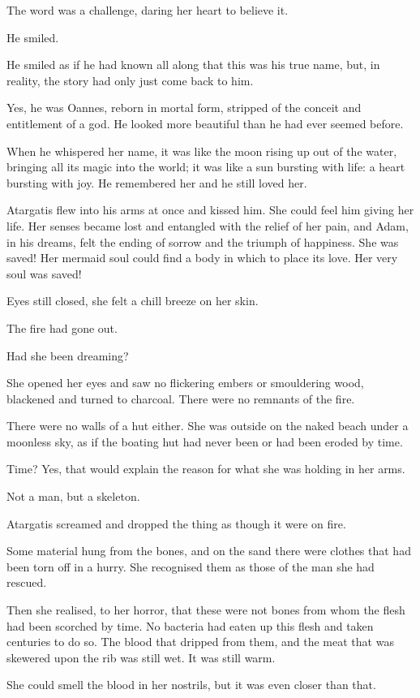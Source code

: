 The word was a challenge, daring her heart to believe it.

He smiled.

He smiled as if he had known all along that this was his true name,
but, in reality, the story had only just come back to him.

Yes, he was Oannes, reborn in mortal form, stripped of the conceit and
entitlement of a god.  He looked more beautiful than he had ever
seemed before.

When he whispered her name, it was like the moon rising up out of the
water, bringing all its magic into the world; it was like a sun
bursting with life: a heart bursting with joy. He remembered her and
he still loved her.

Atargatis flew into his arms at once and kissed him. She could feel
him giving her life. Her senses became lost and entangled with the
relief of her pain, and Adam, in his dreams, felt the ending of sorrow
and the triumph of happiness. She was saved! Her mermaid soul could
find a body in which to place its love. Her very soul was saved!

Eyes still closed, she felt a chill breeze on her skin.

The fire had gone out.

Had she been dreaming?

She opened her eyes and saw no flickering embers or smouldering wood,
blackened and turned to charcoal. There were no remnants of the fire.

There were no walls of a hut either. She was outside on the naked
beach under a moonless sky, as if the boating hut had never been or
had been eroded by time.

Time? Yes, that would explain the reason for what she was holding in
her arms.

Not a man, but a skeleton.

Atargatis screamed and dropped the thing as though it were on fire.

Some material hung from the bones, and on the sand there were clothes
that had been torn off in a hurry. She recognised them as those of the
man she had rescued.

Then she realised, to her horror, that these were not bones from whom
the flesh had been scorched by time. No bacteria had eaten up this
flesh and taken centuries to do so. The blood that dripped from them,
and the meat that was skewered upon the rib was still wet. It was
still warm.

She could smell the blood in her nostrils, but it was even closer than
that.

